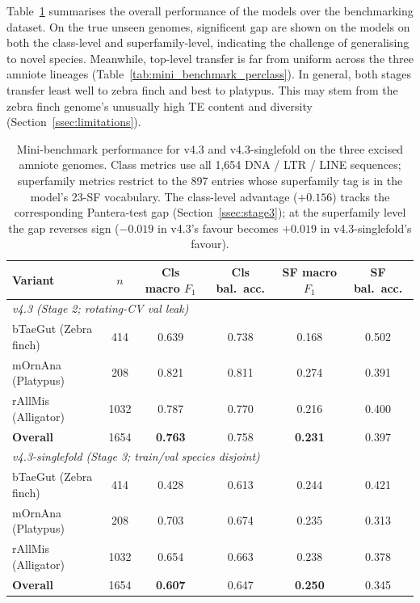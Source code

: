 \documentclass[12pt]{article}
\begin{document}
Table~\ref{tab:mini_benchmark} summarises the overall performance of the models over the benchmarking dataset. On the true unseen genomes, significent gap are shown on the models on both the class-level and superfamily-level, indicating the challenge of generalising to novel species. Meanwhile, top-level transfer is far from uniform across the three amniote lineages (Table~\ref{tab:mini_benchmark_perclass}). In general, both stages transfer least well to zebra finch and best to platypus. This may stem from the zebra finch genome's unusually high TE content and diversity (Section~\ref{ssec:limitations}). 

\begin{table}[h]
\centering
\small
\caption{Mini-benchmark performance for v4.3 and v4.3-singlefold on the three excised amniote genomes. Class metrics use all 1{,}654 DNA / LTR / LINE sequences; superfamily metrics restrict to the 897 entries whose superfamily tag is in the model's 23-SF vocabulary. The class-level advantage ($+0.156$) tracks the corresponding Pantera-test gap (Section~\ref{ssec:stage3}); at the superfamily level the gap reverses sign ($-0.019$ in v4.3's favour becomes $+0.019$ in v4.3-singlefold's favour).}
\label{tab:mini_benchmark}
\begin{tabular}{lccccc}
\hline
Variant & $n$ & Cls macro $F_1$ & Cls bal.~acc. & SF macro $F_1$ & SF bal.~acc. \\
\hline
\multicolumn{6}{l}{\textit{v4.3 (Stage 2; rotating-CV val leak)}} \\
\quad bTaeGut (Zebra finch)        &  414 & 0.639 & 0.738 & 0.168 & 0.502 \\
\quad mOrnAna (Platypus)           &  208 & 0.821 & 0.811 & 0.274 & 0.391 \\
\quad rAllMis (Alligator)          & 1032 & 0.787 & 0.770 & 0.216 & 0.400 \\
\quad \textbf{Overall}             & 1654 & \textbf{0.763} & 0.758 & \textbf{0.231} & 0.397 \\
\hline
\multicolumn{6}{l}{\textit{v4.3-singlefold (Stage 3; train/val species disjoint)}} \\
\quad bTaeGut (Zebra finch)        &  414 & 0.428 & 0.613 & 0.244 & 0.421 \\
\quad mOrnAna (Platypus)           &  208 & 0.703 & 0.674 & 0.235 & 0.313 \\
\quad rAllMis (Alligator)          & 1032 & 0.654 & 0.663 & 0.238 & 0.378 \\
\quad \textbf{Overall}             & 1654 & \textbf{0.607} & 0.647 & \textbf{0.250} & 0.345 \\
\hline
\end{tabular}
\end{table}
\end{document}
